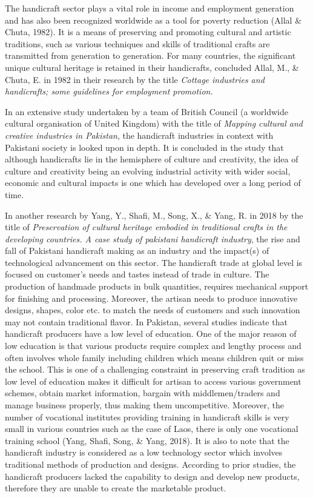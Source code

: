 The handicraft sector plays a vital role in income and employment generation and has also been recognized worldwide as a tool for poverty reduction (Allal \& Chuta, 1982). It is a means of preserving and promoting cultural and artistic traditions, such as various techniques and skills of traditional crafts are transmitted from generation to generation. For many countries, the significant unique cultural heritage is retained in their handicrafts, concluded Allal, M., \& Chuta, E. in 1982 in their research by the title \textit {Cottage industries and handicrafts; some guidelines for employment promotion.}

In an extensive study undertaken by a team of British Council (a worldwide cultural organisation of United Kingdom) with the title of \textit {Mapping cultural and creative industries in Pakistan}, the handicraft industries in context with Pakistani society is looked upon in depth. It is concluded in the study that although handicrafts lie in the hemisphere of culture and creativity, the idea of culture and creativity being an evolving industrial activity with wider social, economic and cultural impacts is one which has developed over a long period of time.

In another research by Yang, Y., Shafi, M., Song, X., \& Yang, R. in 2018 by the title of \textit {Preservation of cultural heritage embodied in traditional crafts in the developing countries. A case study of pakistani handicraft industry}, the rise and fall of Pakistani handicraft making as an industry and the impact(s) of technological advancement on this sector. The handicraft trade at global level is focused on customer’s needs and tastes instead of trade in culture. The production of handmade products in bulk quantities, requires mechanical support for finishing and processing. Moreover, the artisan needs to produce innovative designs, shapes, color etc. to match the needs of customers and such innovation may not contain traditional flavor. In Pakistan, several studies indicate that handicraft producers have a low level of education. One of the major reason of low education is that various products require complex and lengthy process and often involves whole family including children which means children quit or miss the school. This is one of a challenging constraint in preserving craft tradition as low level of education makes it difficult for artisan to access various government schemes, obtain market information, bargain with middlemen/traders and manage business properly, thus making them uncompetitive. Moreover, the number of vocational institutes providing training in handicraft skills is very small in various countries such as the case of Laos, there is only one vocational training school (Yang, Shafi, Song, \& Yang, 2018). It is also to note  that the handicraft industry is considered as a low technology sector which involves traditional methods of production and designs. According to prior studies, the handicraft producers lacked the capability to design and develop new products, therefore they are unable to create the marketable product.

